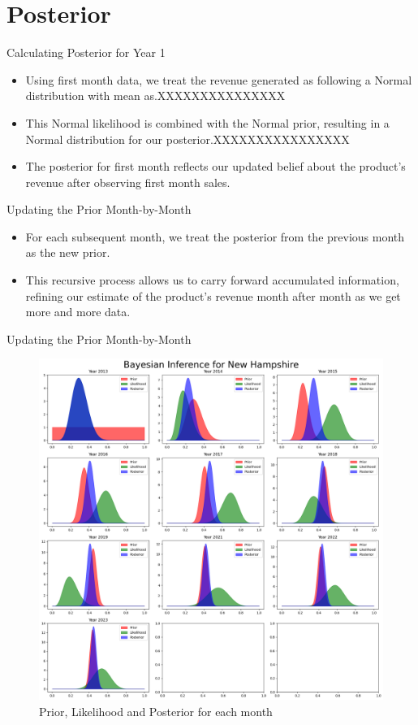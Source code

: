 \section{Posterior}

\begin{frame}{Calculating Posterior for Year 1}

  \begin{itemize}
    \item Using first month data, we treat the revenue generated as following a Normal distribution with mean as.XXXXXXXXXXXXXXX
    \item This Normal likelihood is combined with the Normal prior, resulting in a Normal distribution for our posterior.XXXXXXXXXXXXXXXX
    \item The posterior for first month reflects our updated belief about the product's revenue after observing first month sales.
  \end{itemize}
  
\end{frame}

\begin{frame}{Updating the Prior Month-by-Month}

  \begin{itemize}
    \item For each subsequent month, we treat the posterior from the previous month as the new prior.
    \item This recursive process allows us to carry forward accumulated information, refining our estimate of the product's revenue month after month as we get more and more data.
  \end{itemize}
  
\end{frame}

\begin{frame}{Updating the Prior Month-by-Month}
    
\begin{figure}
  \centering
  \includegraphics[width=.7\linewidth]{../Report/images/posterior-subplots.png}
  \caption{Prior, Likelihood and Posterior for each month}
\end{figure}

\end{frame}

